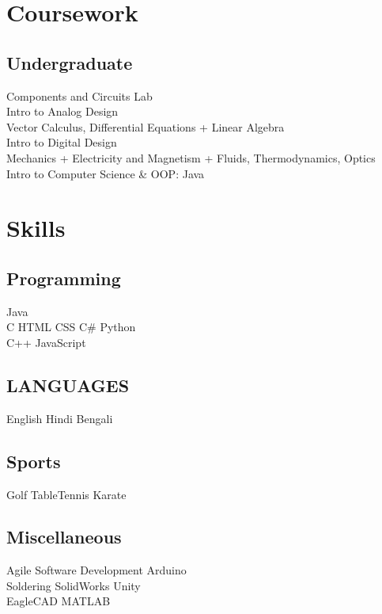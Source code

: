 \documentclass[]{deedy-resume-openfont}
\begin{document}
\begin{minipage}[t]{0.31\textwidth}
\sectionsep

\section{Coursework}

\subsection{Undergraduate}
\textbullet Components and Circuits Lab \\
\textbullet Intro to Analog Design \\
\textbullet Vector Calculus, Differential Equations + Linear Algebra\\
\textbullet Intro to Digital Design \\
\textbullet Mechanics + Electricity and Magnetism + Fluids, Thermodynamics, Optics \\
\textbullet{} Intro to Computer Science \& OOP: Java
\sectionsep


\section{Skills}
\subsection{Programming}
Java  \\
C \textbullet{} HTML \textbullet{} CSS \textbullet{} C\# \textbullet{} Python \\
C++ \textbullet{} JavaScript
\sectionsep
\subsection{LANGUAGES}
English \textbullet{} Hindi \textbullet{} Bengali
\sectionsep

\subsection{Sports}
 Golf \textbullet{} Table\-Tennis \textbullet{} Karate\\
\sectionsep

\subsection{Miscellaneous}
Agile Software Development \textbullet{} Arduino \\
Soldering \textbullet{} SolidWorks \textbullet{} Unity\\
EagleCAD \textbullet{} MATLAB

%
%

\end{minipage} 
\end{document}

